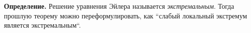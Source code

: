\textbf{Определение.} Решение уравнения Эйлера называется \textit{экстремальным}.
Тогда прошлую теорему можно переформулировать, как ``слабый локальный экстремум является экстремальным``.





